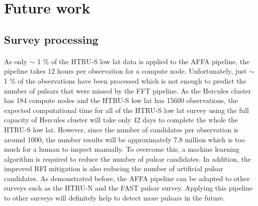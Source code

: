 \documentclass[../chapter1/thesis_msc.tex]{subfiles}
\begin{document}
\section{Future work}
\subsection{Survey processing}
\paragraph{} As only $\sim$ 1 \% of the HTRU-S low lat data is applied to the AFFA pipeline, the pipeline takes 12 hours per observation for a compute node. Unfortunately, just $\sim$ 1 \% of the observations have been processed which is not enough to predict the number of pulsars that were missed by the FFT pipeline. As the Hercules cluster has 184 compute nodes and the HTRU-S low lat has 15600 observations, the expected computational time for all of the HTRU-S low lat survey using the full capacity of Hercules cluster will take only 42 days to complete the whole the HTRU-S low lat. However, since the number of candidates per observation is around 1000, the number results will be approximately 7.8 million which is too much for a human to inspect manually. To overcome this, a machine learning algorithm is required to reduce the number of pulsar candidates. In addition, the improved RFI mitigation is also reducing the number of artificial pulsar candidates.  As demonstrated before, the AFFA pipeline can be adapted to other surveys such as the HTRU-N and the FAST pulsar survey. Applying this pipeline to other surveys will definitely help to detect more pulsars in the future. %
\end{document}
